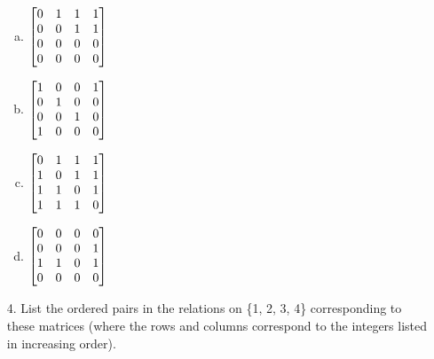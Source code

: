 \begin{itemize}
\begin{enumerate}[a.]
              \item
                    $
                        \begin{bmatrix}
                            0 & 1 & 1 & 1 \\
                            0 & 0 & 1 & 1 \\
                            0 & 0 & 0 & 0 \\
                            0 & 0 & 0 & 0
                        \end{bmatrix}
                        \vspace{2mm}
                    $
              \item
                    $
                        \begin{bmatrix}
                            1 & 0 & 0 & 1 \\
                            0 & 1 & 0 & 0 \\
                            0 & 0 & 1 & 0 \\
                            1 & 0 & 0 & 0
                        \end{bmatrix}
                        \vspace{2mm}
                    $
              \item
                    $
                        \begin{bmatrix}
                            0 & 1 & 1 & 1 \\
                            1 & 0 & 1 & 1 \\
                            1 & 1 & 0 & 1 \\
                            1 & 1 & 1 & 0
                        \end{bmatrix}
                        \vspace{2mm}
                    $
              \item
                    $
                        \begin{bmatrix}
                            0 & 0 & 0 & 0 \\
                            0 & 0 & 0 & 1 \\
                            1 & 1 & 0 & 1 \\
                            0 & 0 & 0 & 0
                        \end{bmatrix}
                        \vspace{2mm}
                    $
          \end{enumerate}
    \item[4.] List the ordered pairs in the relations on \{1, 2, 3, 4\} corresponding to these matrices (where the rows and columns
          correspond to the integers listed in increasing order).
          \begin{enumerate}[a.]


\end{enumerate}
\end{itemize}
